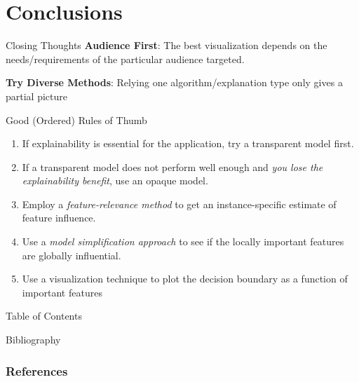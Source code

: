 \documentclass[11pt,dvipsnames,usenames,aspectratio=169]{beamer}  %
\begin{document}
\section{Conclusions}
\begin{frame}{Closing Thoughts}{}
  \textbf{Audience First}: The best visualization depends on the needs/requirements of the particular audience targeted.

  \vspace{18pt}
  \textbf{Try Diverse Methods}: Relying one algorithm/explanation type only gives a partial picture
\end{frame}
\begin{frame}{Good (Ordered) Rules of Thumb}{}
  \begin{enumerate}
    \setlength{\itemsep}{16pt}
    \item If explainability is essential for the application, try a transparent model first.
    \item If a transparent model does not perform well enough and \textit{you lose the explainability benefit}, use an opaque model.
    \item Employ a \textit{feature-relevance method} to get an instance-specific estimate of feature influence.
    \item Use a \textit{model simplification approach} to see if the locally important features are globally influential.
    \item Use a visualization technique to plot the decision boundary as a function of important features
  \end{enumerate}
\end{frame}

\appendix

\begin{frame} {Table of Contents}
  \tableofcontents
\end{frame}

\begin{frame}[allowframebreaks]{Bibliography}{}
  {\tiny
    \frametitle{References}
    
    
  }
\end{frame}
\end{document}
